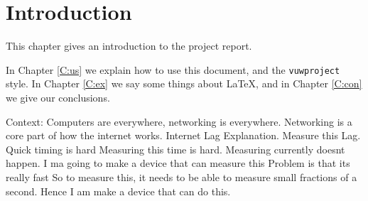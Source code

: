 \chapter{Introduction}\label{C:intro}
This chapter gives an introduction to the project report.

In Chapter \ref{C:us} we explain how to use this document, and the \texttt{vuwproject} style. In Chapter \ref{C:ex} we say some things about \LaTeX, and in Chapter \ref{C:con} we give our conclusions.

Context: 
Computers are everywhere, networking is everywhere. Networking is a core part of how the internet works.
Internet Lag Explanation.
Measure this Lag.
Quick timing is hard
Measuring this time is hard.
Measuring currently doesnt happen.
I ma going to make a device that can measure this
Problem is that its really fast
So to measure this, it needs to be able to measure small fractions of a second.
Hence I am make a device that can do this.
